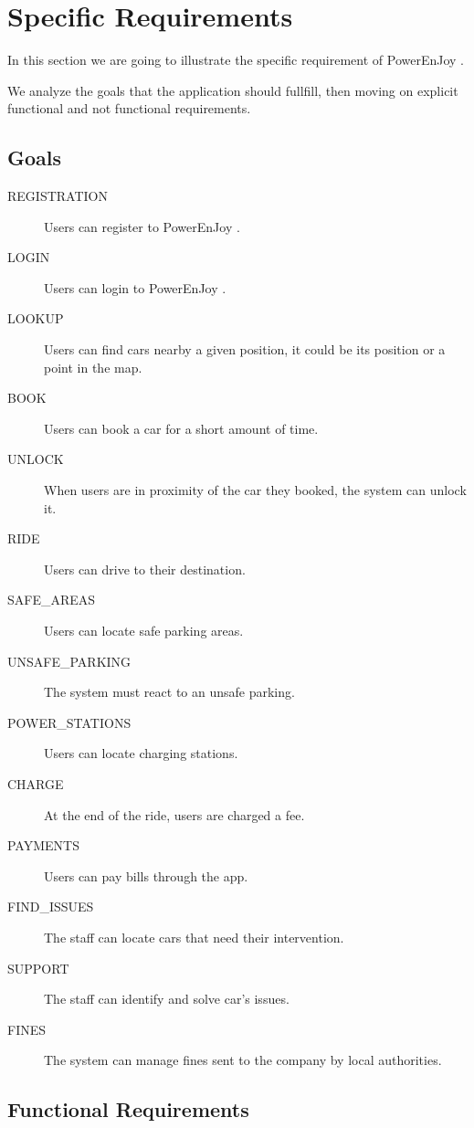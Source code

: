 \documentclass[11pt]{article} %
\newcommand{\pe}{PowerEnJoy }
\begin{document}
\newpage

\section{Specific Requirements}

In this section we are going to illustrate the specific requirement of \pe.

We analyze the goals that the application should fullfill, then moving on explicit functional and not functional requirements.

 \subsection{Goals}

 \begin{description}
 	\item[REGISTRATION] Users can register to \pe.
	\item[LOGIN] Users can login to \pe.
 	\item[LOOKUP] Users can find cars nearby a given position, it could be its position or a point in the map.
 	\item[BOOK] Users can book a car for a short amount of time.
 	\item[UNLOCK] When users are in proximity of the car they booked, the system can unlock it.
	\item[RIDE] Users can drive to their destination.
	\item[SAFE\_AREAS] Users can locate safe parking areas.
	\item[UNSAFE\_PARKING] The system must react to an unsafe parking.
	\item[POWER\_STATIONS] Users can locate charging stations.
	\item[CHARGE] At the end of the ride, users are charged a fee.
	\item[PAYMENTS] Users can pay bills through the app.
	\item[FIND\_ISSUES] The staff can locate cars that need their intervention.
	\item[SUPPORT] The staff can identify and solve car's issues.
	\item[FINES] The system can manage fines sent to the company by local authorities.
 \end{description}


\subsection{Functional Requirements}
\end{document}
